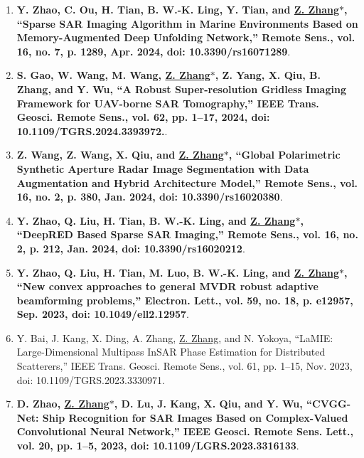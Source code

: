 \documentclass[paper=a4,fontsize=11pt]{scrartcl}
\begin{document}
\begin{enumerate}
\item \textbf{Y. Zhao, C. Ou, H. Tian, B. W.-K. Ling, Y. Tian, and \underline{Z. Zhang$\ast$}, ``Sparse SAR Imaging Algorithm in Marine Environments Based on Memory-Augmented Deep Unfolding Network,'' Remote Sens., vol. 16, no. 7, p. 1289, Apr. 2024, doi: 10.3390/rs16071289}.

\item \textbf{S. Gao, W. Wang, M. Wang, \underline{Z. Zhang$\ast$}, Z. Yang, X. Qiu, B. Zhang, and Y. Wu, ``A Robust Super-resolution Gridless Imaging Framework for UAV-borne SAR Tomography,'' IEEE Trans. Geosci. Remote Sens., vol. 62, pp. 1–17, 2024, doi: 10.1109/TGRS.2024.3393972.}.

\item \textbf{Z. Wang, Z. Wang, X. Qiu, and \underline{Z. Zhang$\ast$}, ``Global Polarimetric Synthetic Aperture Radar Image Segmentation with Data Augmentation and Hybrid Architecture Model,'' Remote Sens., vol. 16, no. 2, p. 380, Jan. 2024, doi: 10.3390/rs16020380}.

\item \textbf{Y. Zhao, Q. Liu, H. Tian, B. W.-K. Ling, and \underline{Z. Zhang$\ast$}, ``DeepRED Based Sparse SAR Imaging,'' Remote Sens., vol. 16, no. 2, p. 212, Jan. 2024, doi: 10.3390/rs16020212}.

\item \textbf{Y. Zhao, Q. Liu, H. Tian, M. Luo, B. W.-K. Ling, and \underline{Z. Zhang$\ast$}, ``New convex approaches to general MVDR robust adaptive beamforming problems,'' Electron. Lett., vol. 59, no. 18, p. e12957, Sep. 2023, doi: 10.1049/ell2.12957}.
	
\item Y. Bai, J. Kang, X. Ding, A. Zhang, \underline{Z. Zhang}, and N. Yokoya, ``LaMIE: Large-Dimensional Multipass InSAR Phase Estimation for Distributed Scatterers,'' IEEE Trans. Geosci. Remote Sens., vol. 61, pp. 1–15, Nov. 2023, doi: 10.1109/TGRS.2023.3330971.


\item \textbf{D. Zhao, \underline{Z. Zhang$\ast$}, D. Lu, J. Kang, X. Qiu, and Y. Wu, ``CVGG-Net: Ship Recognition for SAR Images Based on Complex-Valued Convolutional Neural Network,'' IEEE Geosci. Remote Sens. Lett., vol. 20, pp. 1–5, 2023, doi: 10.1109/LGRS.2023.3316133}.​
	

\end{enumerate}
\end{document}
